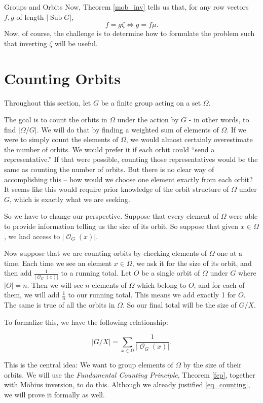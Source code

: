 \documentclass[12pt]{pom_thesis}
\DeclareMathOperator{\sub}{Sub}
\DeclareMathOperator{\orb}{\mathcal{O}}
\begin{document}
\begin{chapter}{Groups and Orbits}
Now, Theorem \ref{mob_inv} tells us that, for any row vectors $f,g$ of length $|\sub{G}|$, 
\[
f = g\zeta \iff g = f\mu.
\]
Now, of course, the challenge is to determine how to formulate the problem such that inverting $\zeta$ will be useful.
\section{Counting Orbits}
Throughout this section, let $G$ be a finite group acting on a set $\Omega$.

The goal is to count the orbits in $\Omega$ under the action by $G$ - in other words, to find $|\Omega/G|$. We will do that by finding a weighted sum of elements of $\Omega$. If we were to simply count the elements of $\Omega$, we would almost certainly overestimate the number of orbits. We would prefer it if each orbit could ``send a representative.'' If that were possible, counting those representatives would be the same as counting the number of orbits. But there is no clear way of accomplishing this -- how would we choose one element exactly from each orbit? It seems like this would require prior knowledge of the orbit structure of $\Omega$ under $G$, which is exactly what we are seeking.

So we have to change our perspective. Suppose that every element of $\Omega$ were able to provide information telling us the size of its orbit. So suppose that given $x \in \Omega$, we had access to $|\orb_G(x)|$. 

Now suppose that we are counting orbits by checking elements of $\Omega$ one at a time. Each time we see an element $x \in \Omega$, we ask it for the size of its orbit, and then add $\frac 1 {|\orb_G(x)|}$ to a running total. Let $O$ be a single orbit of $\Omega$ under $G$ where $|O|=n$. Then we will see $n$ elements of $\Omega$ which belong to $O$, and for each of them, we will add $\frac 1n$ to our running total. This means we add exactly 1 for $O$. The same is true of all the orbits in $\Omega$. So our final total will be the size of $G/X$.

To formalize this, we have the following relationship:

\begin{equation}\label{eq_counting}
|G/X| = \sum_{x \in \Omega}\frac 1 {|\orb_G(x)|}.
\end{equation}

This is the central idea: We want to group elements of $\Omega$ by the size of their orbits. We will use the \emph{Fundamental Counting Principle}, Theorem \ref{fcp}, together with M\"obius inversion, to do this. Although we already justified \eqref{eq_counting}, we will prove it formally as well.


\end{chapter}
\end{document}
